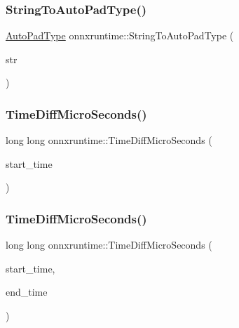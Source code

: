 \subsubsection{\texorpdfstring{String\+To\+Auto\+Pad\+Type()}{StringToAutoPadType()}}
{\footnotesize\ttfamily \mbox{\hyperlink{namespaceonnxruntime_add1059a27d156d4ed3567a3a6852d94f}{Auto\+Pad\+Type}} onnxruntime\+::\+String\+To\+Auto\+Pad\+Type (\begin{DoxyParamCaption}\item[{const std\+::string \&}]{str }\end{DoxyParamCaption})\hspace{0.3cm}{\ttfamily [inline]}}

\mbox{\label{namespaceonnxruntime_af7cfb00a792e50dabc5c9a64958b362b}} 
\subsubsection{\texorpdfstring{Time\+Diff\+Micro\+Seconds()}{TimeDiffMicroSeconds()}\hspace{0.1cm}{\footnotesize\ttfamily [1/2]}}
{\footnotesize\ttfamily long long onnxruntime\+::\+Time\+Diff\+Micro\+Seconds (\begin{DoxyParamCaption}\item[{\mbox{\hyperlink{namespaceonnxruntime_a9b5a17a572f7c3cf77f4892542bd7153}{Time\+Point}}}]{start\+\_\+time }\end{DoxyParamCaption})\hspace{0.3cm}{\ttfamily [inline]}}

\mbox{\label{namespaceonnxruntime_a1b0e87e3cdcf125a929ecbee1ebf225c}} 
\subsubsection{\texorpdfstring{Time\+Diff\+Micro\+Seconds()}{TimeDiffMicroSeconds()}\hspace{0.1cm}{\footnotesize\ttfamily [2/2]}}
{\footnotesize\ttfamily long long onnxruntime\+::\+Time\+Diff\+Micro\+Seconds (\begin{DoxyParamCaption}\item[{\mbox{\hyperlink{namespaceonnxruntime_a9b5a17a572f7c3cf77f4892542bd7153}{Time\+Point}}}]{start\+\_\+time,  }\item[{\mbox{\hyperlink{namespaceonnxruntime_a9b5a17a572f7c3cf77f4892542bd7153}{Time\+Point}}}]{end\+\_\+time }\end{DoxyParamCaption})\hspace{0.3cm}{\ttfamily [inline]}}

